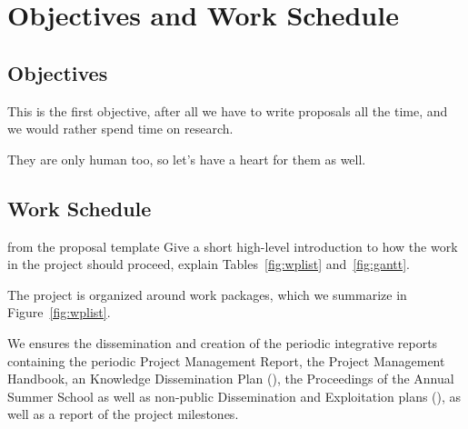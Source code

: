 \section{Objectives and Work Schedule }

\subsection{Objectives}

\begin{objective}[id=firstobj,title=Supporting Authors]
  This is the first objective, after all we have to write proposals all the time, and we
  would rather spend time on research. 
\end{objective}

\begin{objective}[id=secondobj,title=Supporting Reviewers]
  They are only human too, so let's have a heart for them as well. 
\end{objective}

\subsection{Work Schedule} 
\begin{todo}{from the proposal template}
  Give a short high-level introduction to how the work in the project should proceed,
  explain Tables~\ref{fig:wplist} and~\ref{fig:gantt}.
\end{todo}
The project is organized around  work packages, which we summarize in
Figure~\ref{fig:wplist}. 

\wpfig

We ensures the dissemination and creation of the periodic integrative reports containing
the periodic Project Management Report, the Project Management Handbook, an Knowledge
Dissemination Plan ({}), the Proceedings of the Annual {\pn} Summer
School as well as non-public Dissemination and Exploitation plans ({}), as
well as a report of the {\pn} project milestones.

